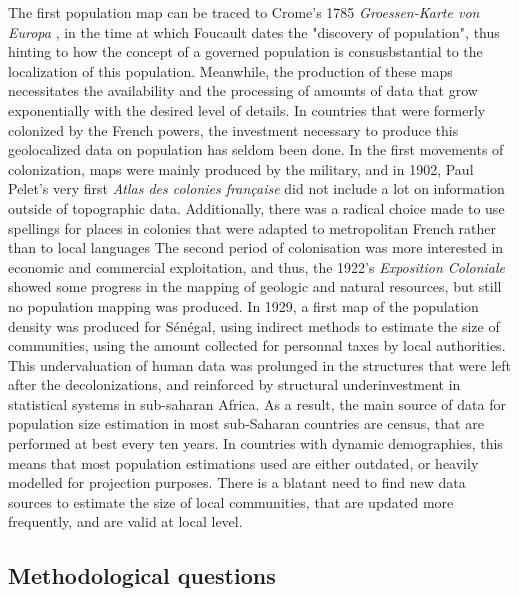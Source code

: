 \documentclass[12pt]{article}\usepackage[]{graphicx}\usepackage[]{color}
\begin{document}
The first population map can be traced to Crome's 1785 \textit{Groessen-Karte von Europa} \cite{klawe_population_1973}, in the time at which Foucault dates the "discovery of population"\cite{foucault2004securite}, thus hinting to how the concept of a governed population is consusbstantial to the localization of this population. Meanwhile, the production of these maps necessitates the availability and the processing of amounts of data that grow exponentially with the desired level of details. In countries that were formerly colonized by the French powers, the investment necessary to produce this geolocalized data on population has seldom been done. In the first movements of colonization, maps were mainly produced by the military, and in 1902, Paul Pelet's very first \textit{Atlas des colonies française}\cite{pelet1902atlas} did not include a lot on
information outside of topographic data\cite{zimmermann_atlas_1903}. Additionally, there was a radical choice made to use spellings for places in colonies that were adapted to metropolitan French rather than to local languages\cite{zimmermann_atlas_1903} The second period of colonisation was more interested in economic and commercial exploitation, and thus, the 1922's \textit{Exposition Coloniale} showed some progress in the mapping of geologic and natural resources, but still no population mapping was produced\cite{rambert_cartographie_1922}. In 1929, a first map of the population density was produced for Sénégal, using indirect methods to estimate the size of communities, using the amount collected for personnal taxes by local authorities\cite{rousseau_population_1929}.
This undervaluation of human data was prolunged in the structures that were left after the decolonizations\cite{lohle1999etat}, and reinforced by structural underinvestment in statistical systems in sub-saharan Africa\cite{jerven2013poor}. As a result, the main source of data for population size estimation in most sub-Saharan countries are census, that are performed at best every ten years. In countries with dynamic demographies, this means that most population estimations used are either outdated, or heavily modelled for projection purposes. There is a blatant need to find new data sources to estimate the size of local communities, that are updated more frequently, and are valid at local level.


\subsection{Methodological questions}
\end{document}
